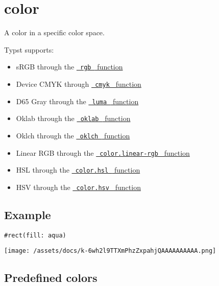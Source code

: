 \section{\texorpdfstring{{ color }}{ color }}\label{summary}

A color in a specific color space.

Typst supports:

\begin{itemize}
\tightlist
\item
  sRGB through the
  \href{/docs/reference/visualize/color/\#definitions-rgb}{\texttt{\ rgb\ }
  function}
\item
  Device CMYK through
  \href{/docs/reference/visualize/color/\#definitions-cmyk}{\texttt{\ cmyk\ }
  function}
\item
  D65 Gray through the
  \href{/docs/reference/visualize/color/\#definitions-luma}{\texttt{\ luma\ }
  function}
\item
  Oklab through the
  \href{/docs/reference/visualize/color/\#definitions-oklab}{\texttt{\ oklab\ }
  function}
\item
  Oklch through the
  \href{/docs/reference/visualize/color/\#definitions-oklch}{\texttt{\ oklch\ }
  function}
\item
  Linear RGB through the
  \href{/docs/reference/visualize/color/\#definitions-linear-rgb}{\texttt{\ color.linear-rgb\ }
  function}
\item
  HSL through the
  \href{/docs/reference/visualize/color/\#definitions-hsl}{\texttt{\ color.hsl\ }
  function}
\item
  HSV through the
  \href{/docs/reference/visualize/color/\#definitions-hsv}{\texttt{\ color.hsv\ }
  function}
\end{itemize}

\subsection{Example}\label{example}

\begin{verbatim}
#rect(fill: aqua)
\end{verbatim}

\texttt{[image: /assets/docs/k-6wh2l9TTXmPhzZxpahjQAAAAAAAAAA.png]}

\subsection{Predefined colors}\label{predefined-colors}

